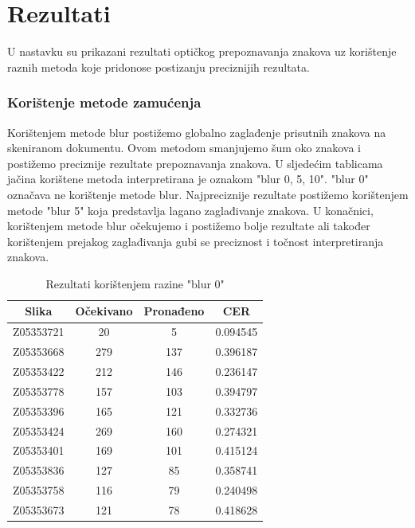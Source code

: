 \documentclass[times, utf8, zavrsni, numeric]{fer}
\begin{document}
\chapter{Rezultati}
U nastavku su prikazani rezultati optičkog prepoznavanja znakova uz korištenje raznih metoda koje pridonose postizanju preciznijih rezultata.

\subsection{Korištenje metode zamućenja}
Korištenjem metode blur postižemo globalno zaglađenje prisutnih znakova na skeniranom dokumentu. Ovom metodom smanjujemo šum oko znakova i postižemo preciznije rezultate prepoznavanja znakova. U sljedećim tablicama jačina korištene metoda interpretirana je oznakom "blur 0, 5, 10". "blur 0" označava ne korištenje metode blur. Najpreciznije rezultate postižemo korištenjem metode "blur 5" koja predstavlja lagano zaglađivanje znakova. U konačnici, korištenjem metode blur očekujemo i postižemo bolje rezultate ali također korištenjem prejakog zaglađivanja gubi se preciznost i točnost interpretiranja znakova.
\begin{table}[H]
	\caption{Rezultati korištenjem razine "blur 0"}
	\label{tbl:Blur 0}
 \centering
        \begin{tabular}{ |*{4}{c|} } \hline
	\multicolumn{1}{|c|}{Slika} & \multicolumn{1}{|c|}{Očekivano} & \multicolumn{1}{|c|}{Pronađeno} & \multicolumn{1}{|c|}{CER}\\ \hline
Z05353721&20&5&0.094545\\ \hline
Z05353668&279&137&0.396187\\ \hline
Z05353422&212&146&0.236147\\ \hline
Z05353778&157&103&0.394797\\ \hline
Z05353396&165&121&0.332736\\ \hline
Z05353424&269&160&0.274321\\ \hline
Z05353401&169&101&0.415124\\ \hline
Z05353836&127&85&0.358741\\ \hline
Z05353758&116&79&0.240498\\ \hline
Z05353673&121&78&0.418628\\ \hline
	\end{tabular}
\end{table}
\end{document}
